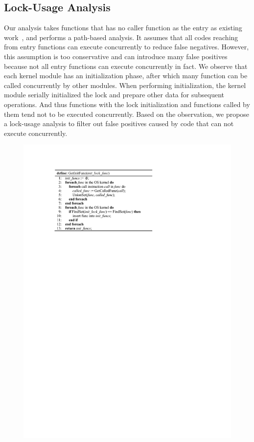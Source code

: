 \subsection{Lock-Usage Analysis}
\label{subsec_lock_usage_analysis}
Our analysis takes functions that has no caller function as the entry as 
existing work~\cite{Li:ASPLOS22}, and performs a path-based analysis. It 
assumes that all codes reaching from entry functions can execute concurrently 
to reduce false negatives. However, this assumption is too conservative and can 
introduce many false positives because not all entry functions can execute 
concurrently in fact. We observe that each kernel module has an initialization 
phase, after which many function can be called concurrently by other modules. 
When performing initialization, the kernel module serially initialized the lock 
and prepare other data for subsequent operations. And thus functions with the 
lock initialization and functions called by them tend not to be executed 
concurrently. Based on the observation, we propose a lock-usage analysis to 
filter out false positives caused by code that can not execute concurrently.

\begin{figure}[htbp]
	\centering
	\includegraphics[width=0.9\linewidth]{figures/fig_pseudocode_lock_usage.pdf}
	\label{fig_pseudocode_lock_usage}
\end{figure}

